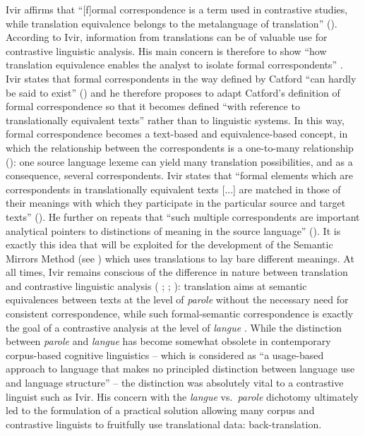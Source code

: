 Ivir affirms that “[f]ormal correspondence is a term used in contrastive studies, while translation equivalence belongs to the metalanguage of translation” (\citeyear[51]{ivir_formal_1981}). According to Ivir, information from translations can be of valuable use for contrastive linguistic analysis. His main concern is therefore to show “how translation equivalence enables the analyst to isolate formal correspondents” \citep[58]{ivir_formal_1981}. Ivir states that formal correspondents in the way defined by Catford “can hardly be said to exist” (\citeyear[54]{ivir_formal_1981}) and he therefore proposes to adapt Catford’s definition of formal correspondence so that it becomes defined “with reference to translationally equivalent texts” \citep[55]{ivir_formal_1981} rather than to linguistic systems. In this way, formal correspondence becomes a text-based and equivalence-based concept, in which the relationship between the correspondents is a one-to-many relationship (\citeyear[55]{ivir_formal_1981}): one source language lexeme can yield many translation possibilities, and as a consequence, several correspondents. Ivir states that “formal elements which are correspondents in translationally equivalent texts [...] are matched in those of their meanings with which they participate in the particular source and target texts” (\citeyear[55]{ivir_formal_1981}). He further on repeats that “such multiple correspondents are important analytical pointers to distinctions of meaning in the source language” (\citeyear[56]{ivir_formal_1981}). It is exactly this idea that will be exploited for the development of the Semantic Mirrors Method (see ) which uses translations to lay bare different meanings. At all times, Ivir remains conscious of the difference in nature between translation and contrastive linguistic analysis (\citeauthor{ivir_contrasting_1969} \citeyear[15]{ivir_contrasting_1969}; \citeyear[17]{ivir_remarks_1970}; \citeyear[173]{ivir_translation-based_1983}): translation aims at semantic equivalences between texts at the level of \textit{parole} without the necessary need for consistent correspondence, while such formal-semantic correspondence is exactly the goal of a contrastive analysis at the level of \textit{langue} \citep[15]{ivir_contrasting_1969}. While the distinction between \textit{parole} and \textit{langue} has become somewhat obsolete in contemporary corpus-based cognitive linguistics – which is considered as “a usage-based approach to language that makes no principled distinction between language use and language structure” \citep[151]{glynn_visualizing_2014} – the distinction was absolutely vital to a contrastive linguist such as Ivir. His concern with the \textit{langue} vs.\ \textit{parole} dichotomy ultimately led to the formulation of a practical solution allowing many corpus and contrastive linguists to fruitfully use translational data: back-translation.

